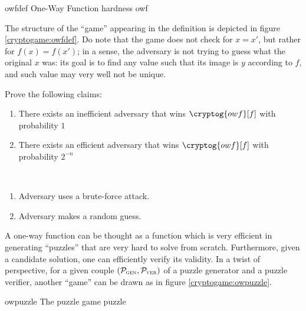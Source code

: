 \begin{cryptogame}
    {owfdef}
    {One-Way Function hardness}
    {owf}


    \cseqdelay


\end{cryptogame}

The structure of the ``game'' appearing in the definition is depicted in figure \ref{cryptogame:owfdef}. Do note that the game does not check for $x = x'$, but rather for $f(x) = f(x')$; in a sense, the adversary is not trying to guess what the original $x$ was: its goal is to find any value such that its image is $y$ according to $f$, and such value may very well not be unique.

\begin{exercise} \label{ex:owf}
    Prove the following claims:
    \begin{enumerate}
        \item There exists an inefficient adversary that wins $\cryptog{owf}[f]$ with probability $1$
        \item There exists an efficient adversary that wins $\cryptog{owf}[f]$ with probability $2^{-n}$
    \end{enumerate}
\end{exercise}

\begin{solution}[\ref{ex:owf}]\
    \begin{enumerate}
        \item Adversary uses a brute-force attack.
        \item Adversary makes a random guess.
    \end{enumerate}
\end{solution}

A one-way function can be thought as a function which is very efficient in generating ``puzzles'' that are very hard to solve from scratch. Furthermore, given a candidate solution, one can efficiently verify its validity. In a twist of perspective, for a given couple $(\mathcal{P}_\textsc{gen},\mathcal{P}_\textsc{ver})$ of a puzzle generator and a puzzle verifier, another ``game'' can be drawn as in figure \ref{cryptogame:owpuzzle}.

\begin{cryptogame}
    {owpuzzle}
    {The puzzle game}
    {puzzle}


    \cseqdelay


\end{cryptogame}

